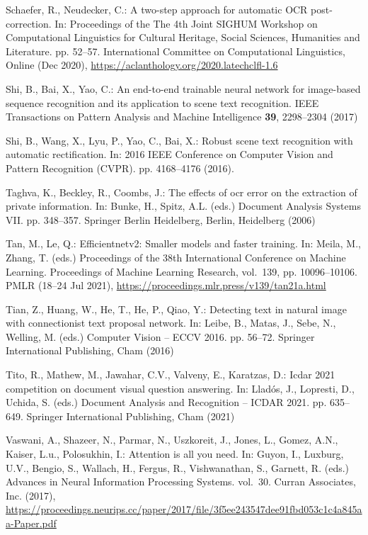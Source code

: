 \documentclass[runningheads]{llncs}
\begin{document}
\begin{thebibliography}{10}
Schaefer, R., Neudecker, C.: A two-step approach for automatic {OCR}
  post-correction. In: Proceedings of the The 4th Joint SIGHUM Workshop on
  Computational Linguistics for Cultural Heritage, Social Sciences, Humanities
  and Literature. pp. 52--57. International Committee on Computational
  Linguistics, Online (Dec 2020),
  \url{https://aclanthology.org/2020.latechclfl-1.6}

Shi, B., Bai, X., Yao, C.: An end-to-end trainable neural network for
  image-based sequence recognition and its application to scene text
  recognition. IEEE Transactions on Pattern Analysis and Machine Intelligence
  \textbf{39},  2298--2304 (2017)

Shi, B., Wang, X., Lyu, P., Yao, C., Bai, X.: Robust scene text recognition
  with automatic rectification. In: 2016 IEEE Conference on Computer Vision and
  Pattern Recognition (CVPR). pp. 4168--4176 (2016).

Taghva, K., Beckley, R., Coombs, J.: The effects of ocr error on the extraction
  of private information. In: Bunke, H., Spitz, A.L. (eds.) Document Analysis
  Systems VII. pp. 348--357. Springer Berlin Heidelberg, Berlin, Heidelberg
  (2006)

Tan, M., Le, Q.: Efficientnetv2: Smaller models and faster training. In: Meila,
  M., Zhang, T. (eds.) Proceedings of the 38th International Conference on
  Machine Learning. Proceedings of Machine Learning Research, vol.~139, pp.
  10096--10106. PMLR (18--24 Jul 2021),
  \url{https://proceedings.mlr.press/v139/tan21a.html}

Tian, Z., Huang, W., He, T., He, P., Qiao, Y.: Detecting text in natural image
  with connectionist text proposal network. In: Leibe, B., Matas, J., Sebe, N.,
  Welling, M. (eds.) Computer Vision -- ECCV 2016. pp. 56--72. Springer
  International Publishing, Cham (2016)

Tito, R., Mathew, M., Jawahar, C.V., Valveny, E., Karatzas, D.: Icdar 2021
  competition on document visual question answering. In: Llad{\'o}s, J.,
  Lopresti, D., Uchida, S. (eds.) Document Analysis and Recognition -- ICDAR
  2021. pp. 635--649. Springer International Publishing, Cham (2021)

Vaswani, A., Shazeer, N., Parmar, N., Uszkoreit, J., Jones, L., Gomez, A.N.,
  Kaiser, L.u., Polosukhin, I.: Attention is all you need. In: Guyon, I.,
  Luxburg, U.V., Bengio, S., Wallach, H., Fergus, R., Vishwanathan, S.,
  Garnett, R. (eds.) Advances in Neural Information Processing Systems.
  vol.~30. Curran Associates, Inc. (2017),
  \url{https://proceedings.neurips.cc/paper/2017/file/3f5ee243547dee91fbd053c1c4a845aa-Paper.pdf}


\end{thebibliography}
\end{document}
